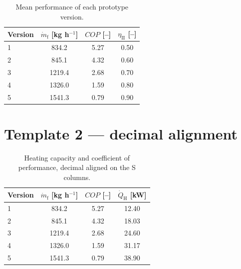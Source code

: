 \documentclass[11pt,a4paper]{article}
\begin{document}
\begin{table}[!htb]
  \centering
  \caption{Mean performance of each prototype version.}
  \label{tab:mean-values}
  \begin{tabular}{lccc}
    \toprule
    Version & $\dot{m}_\mathrm{f}$ [kg h$^{-1}$]
            & $COP$ [--]
            & $\eta_\mathrm{II}$ [--] \\
    \midrule
    1 &  834.2 & 5.27 & 0.50 \\
    2 &  845.1 & 4.32 & 0.60 \\
    3 & 1219.4 & 2.68 & 0.70 \\
    4 & 1326.0 & 1.59 & 0.80 \\
    5 & 1541.3 & 0.79 & 0.90 \\
    \bottomrule
  \end{tabular}
\end{table}

%
\section*{Template 2 --- decimal alignment}

\begin{table}[!htb]
  \centering
  \caption{Heating capacity and coefficient of performance, decimal
           aligned on the S columns.}
  \label{tab:aligned}
  \begin{tabular}{l
                  S[table-format=4.1]
                  S[table-format=1.2]
                  S[table-format=2.2]}
    \toprule
    Version & {$\dot{m}_\mathrm{f}$ [kg h$^{-1}$]}
            & {$COP$ [--]}
            & {$\dot{Q}_\mathrm{H}$ [kW]} \\
     &  834.2 & 5.27 & 12.40 \\
    2 &  845.1 & 4.32 & 18.03 \\
    3 & 1219.4 & 2.68 & 24.60 \\
    4 & 1326.0 & 1.59 & 31.17 \\
    5 & 1541.3 & 0.79 & 38.90 \\
    \bottomrule
  \end{tabular}
\end{table}
\end{document}
